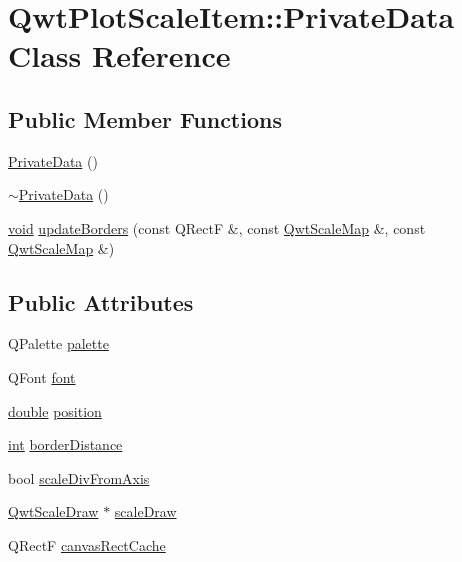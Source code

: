 \hypertarget{class_qwt_plot_scale_item_1_1_private_data}{\section{Qwt\-Plot\-Scale\-Item\-:\-:Private\-Data Class Reference}
\label{class_qwt_plot_scale_item_1_1_private_data}
}
\subsection*{Public Member Functions}
\begin{DoxyCompactItemize}
\item 
\hyperlink{class_qwt_plot_scale_item_1_1_private_data_a9ffaca3e9be6dc2c44ea93657f7a5d47}{Private\-Data} ()
\item 
\hyperlink{class_qwt_plot_scale_item_1_1_private_data_af38a7f61f76ddbbcf181a5ce39a271a4}{$\sim$\-Private\-Data} ()
\item 
\hyperlink{group___u_a_v_objects_plugin_ga444cf2ff3f0ecbe028adce838d373f5c}{void} \hyperlink{class_qwt_plot_scale_item_1_1_private_data_a15d92ce3d9a73105c927b83f5ec257ab}{update\-Borders} (const Q\-Rect\-F \&, const \hyperlink{class_qwt_scale_map}{Qwt\-Scale\-Map} \&, const \hyperlink{class_qwt_scale_map}{Qwt\-Scale\-Map} \&)
\end{DoxyCompactItemize}
\subsection*{Public Attributes}
\begin{DoxyCompactItemize}
\item 
Q\-Palette \hyperlink{class_qwt_plot_scale_item_1_1_private_data_a5fe2af7f269b10c603d0f31abbe0062a}{palette}
\item 
Q\-Font \hyperlink{class_qwt_plot_scale_item_1_1_private_data_ad257eb57dbba476fee168b9a94824b9d}{font}
\item 
\hyperlink{_super_l_u_support_8h_a8956b2b9f49bf918deed98379d159ca7}{double} \hyperlink{class_qwt_plot_scale_item_1_1_private_data_afeba5668df556eab629a60a952eb2260}{position}
\item 
\hyperlink{ioapi_8h_a787fa3cf048117ba7123753c1e74fcd6}{int} \hyperlink{class_qwt_plot_scale_item_1_1_private_data_add205173a8fce1ccf034f2269a2df486}{border\-Distance}
\item 
bool \hyperlink{class_qwt_plot_scale_item_1_1_private_data_a71f14280805cc6401ddb0e5372781e0a}{scale\-Div\-From\-Axis}
\item 
\hyperlink{class_qwt_scale_draw}{Qwt\-Scale\-Draw} $\ast$ \hyperlink{class_qwt_plot_scale_item_1_1_private_data_a79db4c7b2397d1f713d4cf331d06a53b}{scale\-Draw}
\item 
Q\-Rect\-F \hyperlink{class_qwt_plot_scale_item_1_1_private_data_aadc2ce26d26aab57a45253dc16b908c4}{canvas\-Rect\-Cache}
\end{DoxyCompactItemize}


